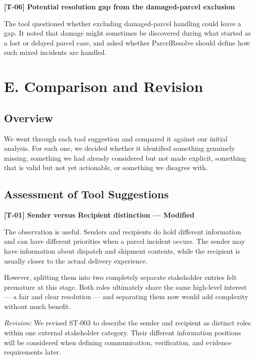 \documentclass[11pt,a4paper]{article}
\begin{document}
\textbf{[T-06] Potential resolution gap from the damaged-parcel
exclusion}

The tool questioned whether excluding damaged-parcel handling could
leave a gap. It noted that damage might sometimes be discovered
during what started as a lost or delayed parcel case, and asked
whether ParcelResolve should define how such mixed incidents are
handled.


\section{E. Comparison and Revision}

\subsection{Overview}

We went through each tool suggestion and compared it against our
initial analysis. For each one, we decided whether it identified
something genuinely missing, something we had already considered but
not made explicit, something that is valid but not yet actionable,
or something we disagree with.

\subsection{Assessment of Tool Suggestions}

\textbf{[T-01] Sender versus Recipient distinction --- Modified}

The observation is useful. Senders and recipients do hold different
information and can have different priorities when a parcel incident
occurs. The sender may have information about dispatch and shipment
contents, while the recipient is usually closer to the actual
delivery experience.

However, splitting them into two completely separate stakeholder
entries felt premature at this stage. Both roles ultimately share
the same high-level interest --- a fair and clear resolution ---
and separating them now would add complexity without much benefit.

\textit{Revision:} We revised ST-003 to describe the sender and
recipient as distinct roles within one external stakeholder category.
Their different information positions will be considered when
defining communication, verification, and evidence requirements
later.
\end{document}
